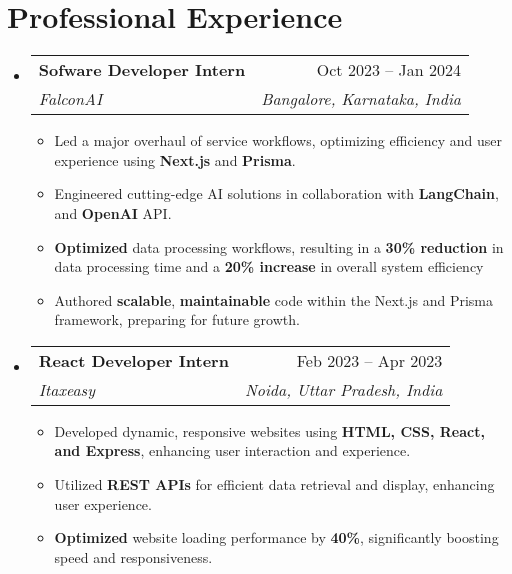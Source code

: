 \documentclass[a4paper,11pt]{article}
\makeatletter
\newcommand{\resumeItem}[1]{
  \item\small{#1}
}
\newcommand{\resumeItemListStart}{\begin{itemize}[label={$\bullet$},rightmargin=0.11in]}
\newcommand{\resumeItemListEnd}{\end{itemize}}
\newcommand{\resumeQuadHeading}[4]{
  \item
  \begin{tabular*}{0.96\textwidth}[t]{l@{\extracolsep{\fill}}r}
    \textbf{#1} & #2 \\
    \textit{\small#3} & \textit{\small #4} \\
  \end{tabular*}
}
\newcommand{\resumeHeadingListStart}{
  \begin{itemize}[leftmargin=0.15in, label={}]
}
\newcommand{\resumeHeadingListEnd}{\end{itemize}}
\makeatother
\begin{document}

\section{Professional Experience}
\resumeHeadingListStart{}
  \resumeQuadHeading{Sofware Developer Intern}{Oct 2023 -- Jan 2024}
  {FalconAI}{Bangalore, Karnataka, India}
    \resumeItemListStart{}
      \resumeItem{Led a major overhaul of service workflows, optimizing efficiency and user experience using \textbf{Next.js} and \textbf{Prisma}.}
      \resumeItem{Engineered cutting-edge AI solutions in collaboration with \textbf{LangChain}, and \textbf{OpenAI} API.}
      \resumeItem{\textbf{Optimized} data processing workflows, resulting in a \textbf{30\% reduction} in data processing time and a \textbf{20\% increase} in overall system efficiency}
      \resumeItem{Authored \textbf{scalable}, \textbf{maintainable} code within the Next.js and Prisma framework, preparing for future growth.}
    \resumeItemListEnd{}
    
\resumeQuadHeading{React Developer Intern}{Feb 2023 -- Apr 2023}
  {Itaxeasy}{Noida, Uttar Pradesh, India}
    \resumeItemListStart{}
      \resumeItem{Developed dynamic, responsive websites using \textbf{HTML, CSS, React, and Express}, enhancing user interaction and experience.}
      \resumeItem{Utilized \textbf{REST APIs} for efficient data retrieval and display, enhancing user experience.}
      \resumeItem{\textbf{Optimized} website loading performance by \textbf{40\%}, significantly boosting speed and responsiveness.}
    \resumeItemListEnd{}
\resumeHeadingListEnd



\end{document}
